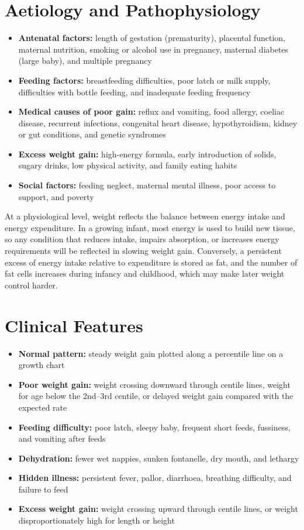 \section*{Aetiology and Pathophysiology}
\begin{itemize}
    \item \textbf{Antenatal factors:} length of gestation (prematurity), placental function, maternal nutrition, smoking or alcohol use in pregnancy, maternal diabetes (large baby), and multiple pregnancy
    \item \textbf{Feeding factors:} breastfeeding difficulties, poor latch or milk supply, difficulties with bottle feeding, and inadequate feeding frequency
    \item \textbf{Medical causes of poor gain:} reflux and vomiting, food allergy, coeliac disease, recurrent infections, congenital heart disease, hypothyroidism, kidney or gut conditions, and genetic syndromes
    \item \textbf{Excess weight gain:} high-energy formula, early introduction of solids, sugary drinks, low physical activity, and family eating habits
    \item \textbf{Social factors:} feeding neglect, maternal mental illness, poor access to support, and poverty
\end{itemize}

At a physiological level, weight reflects the balance between energy intake and energy expenditure. In a growing infant, most energy is used to build new tissue, so any condition that reduces intake, impairs absorption, or increases energy requirements will be reflected in slowing weight gain. Conversely, a persistent excess of energy intake relative to expenditure is stored as fat, and the number of fat cells increases during infancy and childhood, which may make later weight control harder.

\section*{Clinical Features}
\begin{itemize}
    \item \textbf{Normal pattern:} steady weight gain plotted along a percentile line on a growth chart
    \item \textbf{Poor weight gain:} weight crossing downward through centile lines, weight for age below the 2nd--3rd centile, or delayed weight gain compared with the expected rate
    \item \textbf{Feeding difficulty:} poor latch, sleepy baby, frequent short feeds, fussiness, and vomiting after feeds
    \item \textbf{Dehydration:} fewer wet nappies, sunken fontanelle, dry mouth, and lethargy
    \item \textbf{Hidden illness:} persistent fever, pallor, diarrhoea, breathing difficulty, and failure to feed
    \item \textbf{Excess weight gain:} weight crossing upward through centile lines, or weight disproportionately high for length or height
\end{itemize}

